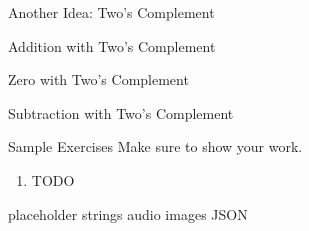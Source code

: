 \begin{frame}{Another Idea: Two's Complement}
\end{frame}

\begin{frame}{Addition with Two's Complement}
\end{frame}

\begin{frame}{Zero with Two's Complement}
\end{frame}

\begin{frame}{Subtraction with Two's Complement}
\end{frame}

\begin{frame}{Sample Exercises}
Make sure to show your work.
\vfill 
\begin{enumerate}
    \item TODO
    \vfill 
\end{enumerate}
\end{frame}




\begin{frame}{placeholder}
    strings
    audio
    images
    JSON
\end{frame}
    
